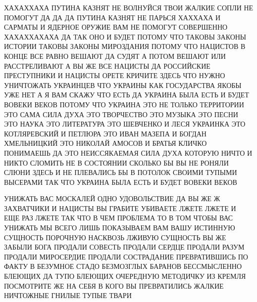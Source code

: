  
 
 
 
 

ХАХАХХАХА ПУТИНА КАЗНЯТ НЕ ВОЛНУЙСЯ ТВОИ ЖАЛКИЕ СОПЛИ НЕ ПОМОГУТ ДА ДА ДА
ПУТИНА КАЗНЯТ НЕ ПАРЬСЯ ХАХХАХА И САРМАТЫ И ЯДЕРНОЕ ОРУЖИЕ ВАМ НЕ ПОМОГУТ
СОВЕРШЕННО ХАХАХХАХАХА ДА ТАК ОНО И БУДЕТ ПОТОМУ ЧТО ТАКОВЫ ЗАКОНЫ ИСТОРИИ
ТАКОВЫ ЗАКОНЫ МИРОЗДАНИЯ ПОТОМУ ЧТО НАЦИСТОВ В КОНЦЕ ВСЕ РАВНО ВЕШАЮТ ДА СУДЯТ
А ПОТОМ ВЕШАЮТ ИЛИ РАССТРЕЛИВАЮТ А ВЫ ЖЕ ВСЕ НАЦИСТЫ ДА РОССИЙСКИЕ ПРЕСТУПНИКИ
И НАЦИСТЫ ОРЕТЕ КРИЧИТЕ ЗДЕСЬ ЧТО НУЖНО УНИЧТОЖАТЬ УКРАИНЦЕВ ЧТО УКРАИНЫ КАК
ГОСУДАРСТВА ЯКОБЫ УЖЕ НЕТ А Я ВАМ СКАЖУ ЧТО ЕСТЬ ДА УКРАИНА БЫЛА ЕСТЬ И БУДЕТ
ВОВЕКИ ВЕКОВ ПОТОМУ ЧТО УКРАИНА ЭТО НЕ ТОЛЬКО ТЕРРИТОРИИ ЭТО САМА СИЛА ДУХА ЭТО
ТВОРЧЕСТВО ЭТО МУЗЫКА ЭТО ПЕСНИ ЭТО НАУКА ЭТО ЛИТЕРАТУРА ЭТО ШЕВЧЕНКО И ЛЕСЯ
УКРАИНКА ЭТО КОТЛЯРЕВСКИЙ И ПЕТЛЮРА ЭТО ИВАН МАЗЕПА И БОГДАН ХМЕЛЬНИЦКИЙ ЭТО
НИКОЛАЙ АМОСОВ И БРАТЬЯ КЛИЧКО ПОНИМАЕШЬ ДА ЭТО НЕИССЯКАЕМАЯ СИЛА ДУХА КОТОРУЮ
НИЧТО И НИКТО СЛОМИТЬ НЕ В СОСТОЯНИИ СКОЛЬКО БЫ ВЫ НЕ РОНЯЛИ СЛЮНИ ЗДЕСЬ И НЕ
ПЛЕВАЛИСЬ БЫ В ПОТОЛОК СВОИМИ ТУПЫМИ ВЫСЕРАМИ ТАК ЧТО УКРАИНА БЫЛА ЕСТЬ И БУДЕТ
ВОВЕКИ ВЕКОВ

УНИЖАТЬ ВАС МОСКАЛЕЙ ОДНО УДОВОЛЬСТВИЕ ДА ВЫ ЖЕ Ж ЗАХВАТЧИКИ И НАЦИСТЫ ВЫ
ГРАБИТЕ УБИВАЕТЕ ЛЖЕТЕ ЛЖЕТЕ И ЕЩЕ РАЗ ЛЖЕТЕ ТАК ЧТО В ЧЕМ ПРОБЛЕМА ТО В ТОМ
ЧТОБЫ ВАС УНИЖАТЬ МЫ ВСЕГО ЛИШЬ ПОКАЗЫВАЕМ ВАМ ВАШУ ИСТИННУЮ СУЩНОСТЬ ПОРОЧНУЮ
НАСКВОЗЬ ЛЖИВУЮ СУЩНОСТЬ ВЫ ЖЕ ЗАБЫЛИ БОГА ПРОДАЛИ СОВЕСТЬ ПРОДАЛИ СЕРДЦЕ
ПРОДАЛИ РАЗУМ ПРОДАЛИ МИРОСЕРДИЕ ПРОДАЛИ СОСТРАДАНИЕ ПРЕВРАТИВШИСЬ ПО ФАКТУ В
БЕЗУМНОЕ СТАДО БЕЗМОЗГЛЫХ БАРАНОВ БЕССМЫСЛЕННО БЛЕЮЩИХ ДА ТУПО БЛЕЮЩИХ
ОЧЕРЕДНУЮ МЕТОДИЧКУ ИЗ КРЕМЛЯ ПОСМОТРИТЕ ЖЕ НА СЕБЯ В КОГО ВЫ ПРЕВРАТИЛИСЬ
ЖАЛКИЕ НИЧТОЖНЫЕ ГНИЛЫЕ ТУПЫЕ ТВАРИ
